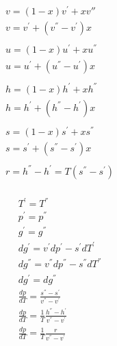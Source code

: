 \documentclass[twocolumn]{article}
\begin{document}
\begin{multicols}{2}

\begin{align*}
	& v = (1-x)v^{'} + xv{''} \\
	& v = v^{'} + (v^{''}-v^{'})x \\ \\
	& u = (1-x) u^{'} + xu^{''} \\
	& u = u^{'} + (u^{''}-u^{'})x \\ \\
	& h = (1-x) h^{'} + xh^{''} \\
	& h = h^{'} + (h^{''}-h^{'})x \\ \\
	& s = (1-x) s^{'} + xs^{''} \\
	& s = s^{'} + (s^{''}-s^{'})x \\ \\
	& r = h^{''} - h^{'} = T(s^{''}-s^{'}) \\
\end{align*}

\begin{align*}
	& T^{'} = T^{''} \\
	& p^{'} = p^{''} \\
	& g^{'} = g^{''} \\
	&dg^{'} = v^{'}dp^{'} - s^{'}dT^{'} \\
	&dg^{''} = v^{''} dp^{''} - s^{''} dT^{''} \\
	&dg^{'} = dg^{''} \\
	& \frac{dp}{dT} = \frac{s^{''} - s^{'}}{v^{''} - v^{'}} \\
	& \frac{dp}{dT} = \frac{1}{T}\frac{h^{''} - h^{'}}{v^{''} - v^{'}} \\
	& \frac{dp}{dT} = \frac{1}{T}\frac{r}{v^{''} -v^{'}} \\
\end{align*}
\end{multicols}

%                                                                         
\end{document}
